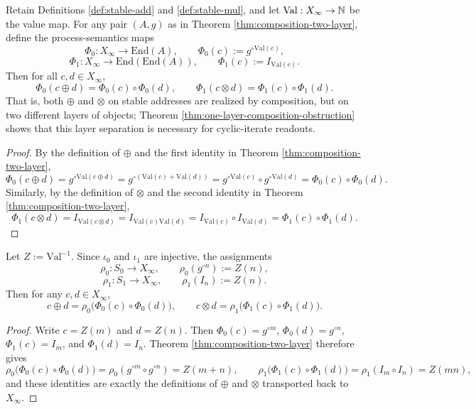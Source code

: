 \begin{theorem}\label{thm:arith-composition}
Retain Definitions \ref{def:stable-add} and \ref{def:stable-mul}, and let \(\mathrm{Val}:X_\infty\to\mathbb{N}\) be the value map. For any pair \((A,g)\) as in Theorem \ref{thm:composition-two-layer}, define the process-semantics maps
\[
\Phi_0:X_\infty\to \mathrm{End}(A),
\qquad
\Phi_0(c):=g^{\circ\mathrm{Val}(c)},
\]
\[
\Phi_1:X_\infty\to \mathrm{End}(\mathrm{End}(A)),
\qquad
\Phi_1(c):=I_{\mathrm{Val}(c)}.
\]
Then for all \(c,d\in X_\infty\),
\[
\Phi_0(c\oplus d)=\Phi_0(c)\circ\Phi_0(d),
\qquad
\Phi_1(c\otimes d)=\Phi_1(c)\circ\Phi_1(d).
\]
That is, both \(\oplus\) and \(\otimes\) on stable addresses are realized by composition, but on two different layers of objects; Theorem \ref{thm:one-layer-composition-obstruction} shows that this layer separation is necessary for cyclic-iterate readouts.
\end{theorem}

\begin{proof}
By the definition of \(\oplus\) and the first identity in Theorem \ref{thm:composition-two-layer},
\[
\Phi_0(c\oplus d)
=g^{\circ\mathrm{Val}(c\oplus d)}
=g^{\circ(\mathrm{Val}(c)+\mathrm{Val}(d))}
=g^{\circ\mathrm{Val}(c)}\circ g^{\circ\mathrm{Val}(d)}
=\Phi_0(c)\circ\Phi_0(d).
\]
Similarly, by the definition of \(\otimes\) and the second identity in Theorem \ref{thm:composition-two-layer},
\[
\Phi_1(c\otimes d)
=I_{\mathrm{Val}(c\otimes d)}
=I_{\mathrm{Val}(c)\mathrm{Val}(d)}
=I_{\mathrm{Val}(c)}\circ I_{\mathrm{Val}(d)}
=\Phi_1(c)\circ\Phi_1(d).
\]
\end{proof}

\begin{corollary}\label{cor:composition-pullback}
Let \(Z:=\mathrm{Val}^{-1}\). Since \(\iota_0\) and \(\iota_1\) are injective, the assignments
\[
\rho_0:S_0\to X_\infty,
\qquad
\rho_0(g^{\circ n}):=Z(n),
\]
\[
\rho_1:S_1\to X_\infty,
\qquad
\rho_1(I_n):=Z(n).
\]
Then for any \(c,d\in X_\infty\),
\[
c\oplus d=\rho_0\bigl(\Phi_0(c)\circ \Phi_0(d)\bigr),
\qquad
c\otimes d=\rho_1\bigl(\Phi_1(c)\circ \Phi_1(d)\bigr).
\]
\end{corollary}

\begin{proof}
Write \(c=Z(m)\) and \(d=Z(n)\). Then \(\Phi_0(c)=g^{\circ m}\), \(\Phi_0(d)=g^{\circ n}\), \(\Phi_1(c)=I_m\), and \(\Phi_1(d)=I_n\). Theorem \ref{thm:composition-two-layer} therefore gives
\[
\rho_0\bigl(\Phi_0(c)\circ \Phi_0(d)\bigr)=\rho_0(g^{\circ m}\circ g^{\circ n})=Z(m+n),
\qquad
\rho_1\bigl(\Phi_1(c)\circ \Phi_1(d)\bigr)=\rho_1(I_m\circ I_n)=Z(mn),
\]
and these identities are exactly the definitions of \(\oplus\) and \(\otimes\) transported back to \(X_\infty\).
\end{proof}

